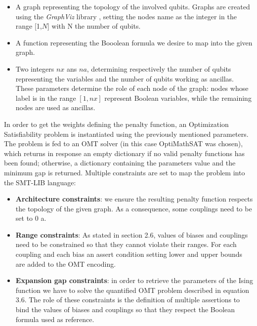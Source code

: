 \begin{itemize}
    \item A graph representing the topology of the involved qubits. Graphs are created using the \textit{GraphViz} library \cite{graphviz}, setting the nodes name as the integer in the range [1,$N$] with N the number of qubits. 
    \item A function representing the Booolean formula we desire to map into the given graph.
    \item Two integers $nx$ ans $na$, determining respectively the number of qubits representing the variables and the number of qubits working as ancillas. These parameters determine the role of each node of the graph: nodes whose label is in the range $[1, nx]$ represent Boolean variables, while the remaining nodes are used as ancillas.
\end{itemize}

In order to get the weights defining the penalty function, an Optimization Satisfiability problem is instantiated using the previously mentioned parameters. The problem is fed to an OMT solver (in this case OptiMathSAT was chosen), which returns in response an empty dictionary if no valid penalty functions has been found; otherwise, a dictionary containing the parameters value and the minimum gap is returned. Multiple constraints are set to map the problem into the SMT-LIB language:
 
\begin{itemize}
    \item \textbf{Architecture constraints}: we ensure the resulting penalty function respects the topology of the given graph. As a consequence, some couplings need to be set to 0 a.
    \item \textbf{Range constraints}: As stated in section 2.6, values of biases and couplings need to be constrained so that they cannot violate their ranges. For each coupling and each bias an assert condition setting lower and upper bounds are added to the OMT encoding.
    \item \textbf{Expansion gap constraints}: in order to retrieve the parameters of the Ising function we have to solve the  quantified OMT problem described in equation 3.6. The role of these constraints is the definition of multiple assertions to bind the values of biases and couplings so that they respect the Boolean formula used as reference.
\end{itemize}


